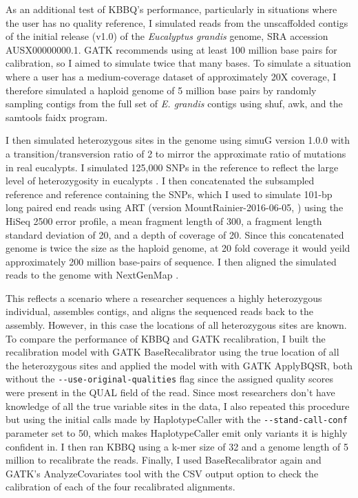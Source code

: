 As an additional test of KBBQ's performance, particularly in situations where the user has no quality reference, I simulated reads from the unscaffolded contigs of the initial release (v1.0) of the \textit{Eucalyptus grandis} genome, SRA accession AUSX00000000.1. GATK recommends using at least 100 million base pairs for calibration, so I aimed to simulate twice that many bases. To simulate a situation where a user has a medium-coverage dataset of approximately 20X coverage, I therefore simulated a haploid genome of 5 million base pairs by randomly sampling contigs from the full set of \textit{E. grandis} contigs using shuf, awk, and the samtools faidx program.

I then simulated heterozygous sites in the genome using simuG version 1.0.0 \parencite{yue_simug_2019} with a transition/transversion ratio of 2 to mirror the approximate ratio of mutations in real eucalypts. I simulated 125,000 SNPs in the reference to reflect the large level of heterozygosity in eucalypts \parencite{kulheim_comparative_2009}. I then concatenated the subsampled reference and reference containing the SNPs, which I used to simulate 101-bp long paired end reads using ART (version MountRainier-2016-06-05, \cite{huang_art_2012}) using the HiSeq 2500 error profile, a mean fragment length of 300, a fragment length standard deviation of 20, and a depth of coverage of 20. Since this concatenated genome is twice the size as the haploid genome, at 20 fold coverage it would yeild approximately 200 million base-pairs of sequence. I then aligned the simulated reads to the genome with NextGenMap \parencite{sedlazeck_nextgenmap_2013}.

This reflects a scenario where a researcher sequences a highly heterozygous individual, assembles contigs, and aligns the sequenced reads back to the assembly. However, in this case the locations of all heterozygous sites are known. To compare the performance of KBBQ and GATK recalibration, I built the recalibration model with GATK BaseRecalibrator using the true location of all the heterozygous sites and applied the model with with GATK ApplyBQSR, both without the \texttt{-\phantom{}-use-original-qualities} flag since the assigned quality scores were present in the QUAL field of the read. Since most researchers don't have knowledge of all the true variable sites in the data, I also repeated this procedure but using the initial calls made by HaplotypeCaller with the \texttt{-\phantom{}-stand-call-conf} parameter set to 50, which makes HaplotypeCaller emit only variants it is highly confident in. I then ran KBBQ using a k-mer size of 32 and a genome length of 5 million to recalibrate the reads. Finally, I used BaseRecalibrator again and GATK's AnalyzeCovariates tool with the CSV output option to check the calibration of each of the four recalibrated alignments.

